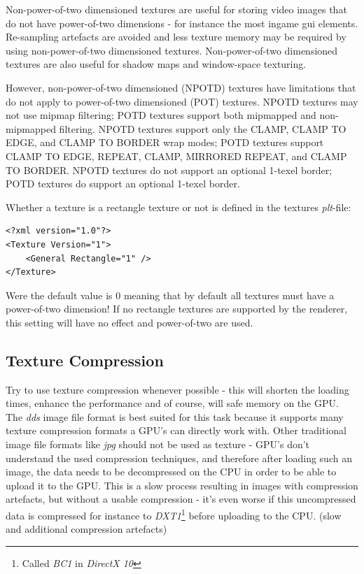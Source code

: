 Non-power-of-two dimensioned textures are useful for storing video images that do not have power-of-two dimensions - for instance the most ingame gui elements. Re-sampling artefacts are avoided and less texture memory may be required by using non-power-of-two dimensioned textures. Non-power-of-two dimensioned textures are also useful for shadow maps and window-space texturing.

However, non-power-of-two dimensioned (NPOTD) textures have limitations that do not apply to power-of-two dimensioned (POT) textures. NPOTD textures may not use mipmap filtering; POTD textures support both mipmapped and non-mipmapped filtering. NPOTD textures support only the CLAMP, CLAMP TO EDGE, and CLAMP TO BORDER wrap modes; POTD textures support CLAMP TO EDGE, REPEAT, CLAMP, MIRRORED REPEAT, and CLAMP TO BORDER. NPOTD textures do not support an optional 1-texel border;
POTD textures do support an optional 1-texel border.

Whether a texture is a rectangle texture or not is defined in the textures \emph{plt}-file:

\begin{lstlisting}[caption=\emph{plt}-file rectangle texture setup]
<?xml version="1.0"?>
<Texture Version="1">
	<General Rectangle="1" />
</Texture>
\end{lstlisting}

Were the default value is 0 meaning that by default all textures must have a power-of-two dimension! If no rectangle textures are supported by the renderer, this setting will have no effect and power-of-two are used.




\subsection{Texture Compression}
Try to use texture compression whenever possible - this will shorten the loading times, enhance the performance and of course, will safe memory on the GPU. The \emph{dds} image file format is best suited for this task because it supports many texture compression formats a GPU's can directly work with. Other traditional image file formats like \emph{jpg} should not be used as texture - GPU's don't understand the used compression techniques, and therefore after loading such an image, the data needs to be decompressed on the CPU in order to be able to upload it to the GPU. This is a slow process resulting in images with compression artefacts, but without a usable compression - it's even worse if this uncompressed data is compressed for instance to \emph{DXT1}\footnote{Called \emph{BC1} in \emph{DirectX 10}} before uploading to the CPU. (slow and additional compression artefacts)

